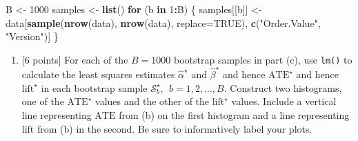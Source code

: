 \documentclass[
]{article}
\newenvironment{Shaded}{\begin{snugshade}}{\end{snugshade}}
\newcommand{\AttributeTok}[1]{\textcolor[rgb]{0.13,0.29,0.53}{#1}}
\newcommand{\ConstantTok}[1]{\textcolor[rgb]{0.56,0.35,0.01}{#1}}
\newcommand{\ControlFlowTok}[1]{\textcolor[rgb]{0.13,0.29,0.53}{\textbf{#1}}}
\newcommand{\DecValTok}[1]{\textcolor[rgb]{0.00,0.00,0.81}{#1}}
\newcommand{\FunctionTok}[1]{\textcolor[rgb]{0.13,0.29,0.53}{\textbf{#1}}}
\newcommand{\NormalTok}[1]{#1}
\newcommand{\OtherTok}[1]{\textcolor[rgb]{0.56,0.35,0.01}{#1}}
\newcommand{\SpecialCharTok}[1]{\textcolor[rgb]{0.81,0.36,0.00}{\textbf{#1}}}
\newcommand{\StringTok}[1]{\textcolor[rgb]{0.31,0.60,0.02}{#1}}
\providecommand{\tightlist}{%
  \setlength{\itemsep}{0pt}\setlength{\parskip}{0pt}}
\begin{document}
\begin{Shaded}
\begin{Highlighting}[]
\NormalTok{B }\OtherTok{\textless{}{-}} \DecValTok{1000}
\NormalTok{samples }\OtherTok{\textless{}{-}} \FunctionTok{list}\NormalTok{()}
\ControlFlowTok{for}\NormalTok{ (b }\ControlFlowTok{in} \DecValTok{1}\SpecialCharTok{:}\NormalTok{B) \{}
\NormalTok{  samples[[b]] }\OtherTok{\textless{}{-}}\NormalTok{ data[}\FunctionTok{sample}\NormalTok{(}\FunctionTok{nrow}\NormalTok{(data), }\FunctionTok{nrow}\NormalTok{(data), }\AttributeTok{replace=}\ConstantTok{TRUE}\NormalTok{), }\FunctionTok{c}\NormalTok{(}\StringTok{"Order.Value"}\NormalTok{, }\StringTok{"Version"}\NormalTok{)]}
\NormalTok{\}}
\end{Highlighting}
\end{Shaded}

\begin{enumerate}
\def\labelenumi{(\alph{enumi})}
\setcounter{enumi}{3}
\tightlist
\item
  {[}6 points{]} For each of the \(B=1000\) bootstrap samples in part
  (c), use \texttt{lm()} to calculate the least squares estimates
  \(\hat\alpha^\star\) and \(\hat\beta^\star\) and hence
  \(\text{ATE}^\star\) and hence \(\text{lift}^\star\) in each bootstrap
  sample \(\mathcal{S}_b^\star, ~~ b=1,2,...,B.\) Construct two
  histograms, one of the \(\text{ATE}^\star\) values and the other of
  the \(\text{lift}^\star\) values. Include a vertical line representing
  \(\text{ATE}\) from (b) on the first histogram and a line representing
  \(\text{lift}\) from (b) in the second. Be sure to informatively label
  your plots.
\end{enumerate}

\begin{Shaded}
\end{Shaded}
\end{document}
